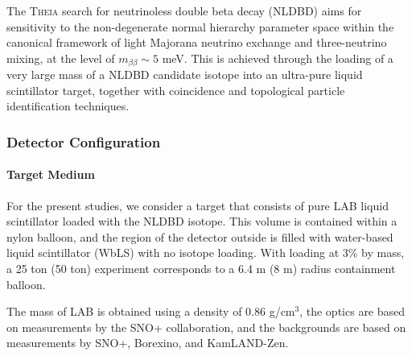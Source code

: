 %
%
%
%
%

The \textsc{Theia} search for neutrinoless double beta decay (NLDBD) aims for
sensitivity to the non-degenerate normal hierarchy parameter space
within the canonical framework of light Majorana neutrino exchange and
three-neutrino mixing, at the level of $m_{\beta\beta}\sim5$ meV.
This is achieved through the loading of a very large
mass of a NLDBD candidate isotope into an ultra-pure liquid scintillator
target, together with coincidence and topological particle identification
techniques.

\subsubsection{Detector Configuration}
\paragraph{Target Medium}
For the present studies, we consider a target that consists of pure LAB
liquid scintillator loaded with the NLDBD isotope. This volume is contained
within a nylon balloon, and the region of the detector outside is
filled with water-based liquid scintillator (WbLS) with no isotope loading.
With loading at 3\% by mass, a 25 ton (50 ton) experiment corresponds to a
6.4 m (8 m) radius containment balloon.

The mass of LAB is obtained using a density of 0.86 g/cm$^3$, the optics are
based on measurements by the SNO+ collaboration, and the backgrounds are based
on measurements by SNO+, Borexino, and KamLAND-Zen.

